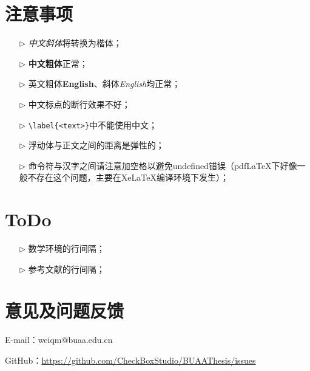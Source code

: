 \section{注意事项}
\begin{itemize}
  \item[$\triangleright$] \textit{中文斜体}将转换为楷体；
  \item[$\triangleright$] \textbf{中文粗体}正常；
  \item[$\triangleright$] 英文粗体\textbf{English}、斜体\textit{English}均正常；
  \item[$\triangleright$] 中文标点的断行效果不好；
  \item[$\triangleright$] \verb|\label{<text>}|中不能使用中文；
  \item[$\triangleright$] 浮动体与正文之间的距离是弹性的；
  \item[$\triangleright$] 命令符与汉字之间请注意加空格以避免undefined错误（pdfLaTeX下好像一般不存在这个问题，主要在XeLaTeX编译环境下发生）；
\end{itemize}

\section{ToDo}
\begin{itemize}
  \item[$\triangleright$] 数学环境的行间隔；
  \item[$\triangleright$] 参考文献的行间隔；
\end{itemize}

\section{意见及问题反馈}

\indent E-mail：weiqm@buaa.edu.cn

\indent GitHub：\href{https://github.com/CheckBoxStudio/BUAAThesis/issues}{https://github.com/CheckBoxStudio/BUAAThesis/issues}
